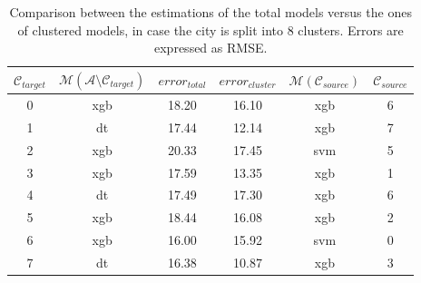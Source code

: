 \begin{table}[!ht]
	\centering
	\scriptsize
	\setlength\extrarowheight{5pt}
	\begin{tabular}{ | c | c | c | c | c | c |}
		\hline
		$\mathcal{C}_{target}$ & $\mathcal{M}(\mathcal{A} \setminus \mathcal{C}_{target})$ & $error_{total}$ & $error_{cluster}$ & $\mathcal{M}(\mathcal{C}_{source})$ & $\mathcal{C}_{source}$ \\ \hline
		0 & xgb & 18.20 & 16.10 & xgb & 6 \\ \hline
		1 & dt & 17.44 & 12.14 & xgb & 7 \\ \hline
		2 & xgb & 20.33 & 17.45 & svm & 5 \\ \hline
		3 &	xgb & 17.59 & 13.35 & xgb &	1 \\ \hline
		4 & dt & 17.49 & 17.30 & xgb & 6 \\ \hline
		5 & xgb & 18.44 & 16.08 & xgb &	2 \\ \hline
		6 & xgb & 16.00 & 15.92 & svm &	0 \\ \hline
		7 & dt & 16.38 & 10.87 & xgb & 3 \\ \hline
	\end{tabular}
	\caption{Comparison between the estimations of the total models versus the ones of clustered models, in case the city is split into 8 clusters. Errors are expressed as RMSE.}
	\label{evaluation:cluster_vs_total_8c}
\end{table}

